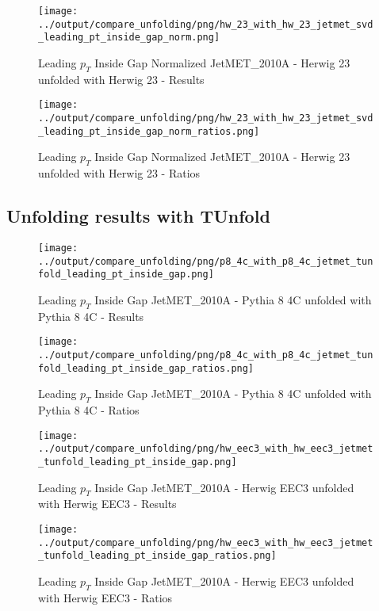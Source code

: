 \documentclass[11pt]{book}
\begin{document}
\begin{figure}[ht]
\centering
\texttt{[image: ../output/compare\_unfolding/png/hw\_23\_with\_hw\_23\_jetmet\_svd\_leading\_pt\_inside\_gap\_norm.png]}
\caption{Leading $p_{T}$ Inside Gap Normalized JetMET\_2010A - Herwig 23 unfolded with Herwig 23 - Results}
\label{hw_23_hw_23_jetmet_svd_leading_pt_inside_gap_norm_a}
\end{figure}

\begin{figure}[ht]
\centering
\texttt{[image: ../output/compare\_unfolding/png/hw\_23\_with\_hw\_23\_jetmet\_svd\_leading\_pt\_inside\_gap\_norm\_ratios.png]}
\caption{Leading $p_{T}$ Inside Gap Normalized JetMET\_2010A - Herwig 23 unfolded with Herwig 23 - Ratios}
\label{hw_23_hw_23_jetmet_svd_leading_pt_inside_gap_norm_b}
\end{figure}

\clearpage
\subsection{Unfolding results with TUnfold}

\begin{figure}[ht]
\centering
\texttt{[image: ../output/compare\_unfolding/png/p8\_4c\_with\_p8\_4c\_jetmet\_tunfold\_leading\_pt\_inside\_gap.png]}
\caption{Leading $p_{T}$ Inside Gap JetMET\_2010A - Pythia 8 4C unfolded with Pythia 8 4C - Results}
\label{p8_p8_jetmet_tunfold_leading_pt_inside_gap_a}
\end{figure}

\begin{figure}[ht]
\centering
\texttt{[image: ../output/compare\_unfolding/png/p8\_4c\_with\_p8\_4c\_jetmet\_tunfold\_leading\_pt\_inside\_gap\_ratios.png]}
\caption{Leading $p_{T}$ Inside Gap JetMET\_2010A - Pythia 8 4C unfolded with Pythia 8 4C - Ratios}
\label{p8_p8_jetmet_tunfold_leading_pt_inside_gap_b}
\end{figure}

\begin{figure}[ht]
\centering
\texttt{[image: ../output/compare\_unfolding/png/hw\_eec3\_with\_hw\_eec3\_jetmet\_tunfold\_leading\_pt\_inside\_gap.png]}
\caption{Leading $p_{T}$ Inside Gap JetMET\_2010A - Herwig EEC3 unfolded with Herwig EEC3 - Results}
\label{hw_eec3_hw_eec3_jetmet_tunfold_leading_pt_inside_gap_a}
\end{figure}

\begin{figure}[ht]
\centering
\texttt{[image: ../output/compare\_unfolding/png/hw\_eec3\_with\_hw\_eec3\_jetmet\_tunfold\_leading\_pt\_inside\_gap\_ratios.png]}
\caption{Leading $p_{T}$ Inside Gap JetMET\_2010A - Herwig EEC3 unfolded with Herwig EEC3 - Ratios}
\label{hw_eec3_hw_eec3_jetmet_tunfold_leading_pt_inside_gap_b}
\end{figure}
\end{document}

